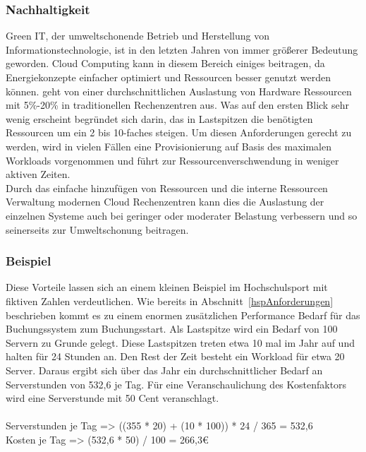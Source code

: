 \subsubsection{Nachhaltigkeit}\label{nachhaltigkeit}
Green IT, der umweltschonende Betrieb und Herstellung von Informationstechnologie, ist in den letzten Jahren von immer größerer Bedeutung geworden. Cloud Computing kann in diesem Bereich einiges beitragen, da Energiekonzepte einfacher optimiert und Ressourcen besser genutzt werden können. \citeauthor*{Siegele.2008} geht von einer durchschnittlichen Auslastung von Hardware Ressourcen mit 5\%-20\% in traditionellen Rechenzentren aus. Was auf den ersten Blick sehr wenig erscheint begründet sich darin, das in Lastspitzen die benötigten Ressourcen um ein 2 bis 10-faches steigen. Um diesen Anforderungen gerecht zu werden, wird in vielen Fällen eine Provisionierung auf Basis des maximalen Workloads vorgenommen und führt zur Ressourcenverschwendung in weniger aktiven Zeiten.\\
Durch das einfache hinzufügen von Ressourcen und die interne Ressourcen Verwaltung modernen Cloud Rechenzentren kann dies die Auslastung der einzelnen Systeme auch bei geringer oder moderater Belastung verbessern und so seinerseits zur Umweltschonung beitragen. 

\subsubsection{Beispiel}
Diese Vorteile lassen sich an einem kleinen Beispiel im Hochschulsport mit fiktiven Zahlen verdeutlichen. Wie bereits in Abschnitt~\ref{hspAnforderungen} beschrieben kommt es zu einem enormen zusätzlichen Performance Bedarf für das Buchungssystem zum Buchungsstart. Als Lastspitze wird ein Bedarf von 100 Servern zu Grunde gelegt. Diese Lastspitzen treten etwa 10 mal im Jahr auf und halten für 24 Stunden an. Den Rest der Zeit besteht ein Workload für etwa 20 Server. Daraus ergibt sich über das Jahr ein durchschnittlicher Bedarf an Serverstunden von 532,6 je Tag. Für eine Veranschaulichung des Kostenfaktors wird eine Serverstunde mit 50 Cent veranschlagt.
\\
\\
Serverstunden je Tag => ((355 * 20) + (10 * 100)) * 24 / 365 = 532,6 \\
Kosten je Tag => (532,6 * 50) / 100 = 266,3€ \\

